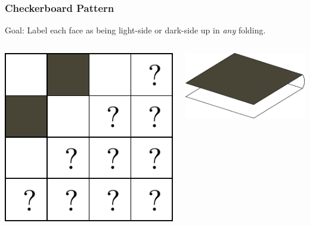 \documentclass{beamer}
\begin{document}
\begin{frame}
\frametitle{Checkerboard Pattern}

\begin{block}{Goal:}
Label each face as being light-side or dark-side up in \textit{any} folding.
\end{block}

\bigskip

\begin{columns}[c]
\includegraphics[width=\textwidth]{sam_images/checkerboard-3c.pdf}

\includegraphics[width=.9\textwidth]{sam_images/checkerboard-3a.pdf}


\end{columns}
\end{frame}
\end{document}
